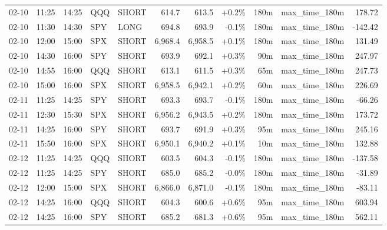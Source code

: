 \documentclass[11pt,a4paper,twoside]{article}
\begin{document}
\begin{center}
\begin{longtable}{>{\color{txtmain}}l l l l l r r r r >{\color{txtmain}}l r}
02-10 & 11:25 & 14:25 & QQQ & SHORT & 614.7 & 613.5 & \textcolor{wingreen}{+0.2\%} & 180m & max\_time\_180m & \textcolor{wingreen}{178.72} \\
02-10 & 11:30 & 14:30 & SPY & LONG & 694.8 & 693.9 & \textcolor{lossred}{-0.1\%} & 180m & max\_time\_180m & \textcolor{lossred}{-142.42} \\
02-10 & 12:00 & 15:00 & SPX & SHORT & 6,968.4 & 6,958.5 & \textcolor{wingreen}{+0.1\%} & 180m & max\_time\_180m & \textcolor{wingreen}{131.49} \\
02-10 & 14:30 & 16:00 & SPY & SHORT & 693.9 & 692.1 & \textcolor{wingreen}{+0.3\%} & 90m & max\_time\_180m & \textcolor{wingreen}{247.97} \\
02-10 & 14:55 & 16:00 & QQQ & SHORT & 613.1 & 611.5 & \textcolor{wingreen}{+0.3\%} & 65m & max\_time\_180m & \textcolor{wingreen}{247.73} \\
02-10 & 15:00 & 16:00 & SPX & SHORT & 6,958.5 & 6,942.1 & \textcolor{wingreen}{+0.2\%} & 60m & max\_time\_180m & \textcolor{wingreen}{226.69} \\
02-11 & 11:25 & 14:25 & SPY & SHORT & 693.3 & 693.7 & \textcolor{lossred}{-0.1\%} & 180m & max\_time\_180m & \textcolor{lossred}{-66.26} \\
02-11 & 12:30 & 15:30 & SPX & SHORT & 6,956.2 & 6,943.5 & \textcolor{wingreen}{+0.2\%} & 180m & max\_time\_180m & \textcolor{wingreen}{173.72} \\
02-11 & 14:25 & 16:00 & SPY & SHORT & 693.7 & 691.9 & \textcolor{wingreen}{+0.3\%} & 95m & max\_time\_180m & \textcolor{wingreen}{245.16} \\
02-11 & 15:50 & 16:00 & SPX & SHORT & 6,950.1 & 6,940.2 & \textcolor{wingreen}{+0.1\%} & 10m & max\_time\_180m & \textcolor{wingreen}{132.88} \\
02-12 & 11:25 & 14:25 & QQQ & SHORT & 603.5 & 604.3 & \textcolor{lossred}{-0.1\%} & 180m & max\_time\_180m & \textcolor{lossred}{-137.58} \\
02-12 & 11:25 & 14:25 & SPY & SHORT & 685.0 & 685.2 & \textcolor{lossred}{-0.0\%} & 180m & max\_time\_180m & \textcolor{lossred}{-31.89} \\
02-12 & 12:00 & 15:00 & SPX & SHORT & 6,866.0 & 6,871.0 & \textcolor{lossred}{-0.1\%} & 180m & max\_time\_180m & \textcolor{lossred}{-83.11} \\
02-12 & 14:25 & 16:00 & QQQ & SHORT & 604.3 & 600.6 & \textcolor{wingreen}{+0.6\%} & 95m & max\_time\_180m & \textcolor{wingreen}{603.94} \\
02-12 & 14:25 & 16:00 & SPY & SHORT & 685.2 & 681.3 & \textcolor{wingreen}{+0.6\%} & 95m & max\_time\_180m & \textcolor{wingreen}{562.11} \\

\end{longtable}
\end{center}
\end{document}
